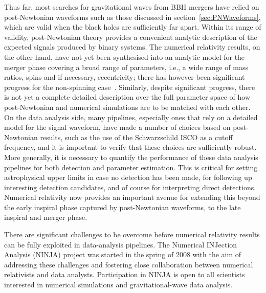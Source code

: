 \newcommand{\Ytwo}{{{}^{-2}Y}}

\newcommand\T{}
\newcommand\B{}
\newcommand\TT{}
\newcommand\BB{}
\newcommand\TTT{}



Thus far, most searches for gravitational waves from BBH mergers have
relied on post-Newtonian waveforms such as those discussed in
section~\ref{sec:PNWaveforms}, which are valid when the black holes
are sufficiently far apart.  Within its range of validity,
post-Newtonian theory provides a convenient analytic description of
the expected signals produced by binary systems.  The numerical
relativity results, on the other hand, have not yet been synthesised
into an analytic model for the merger phase covering a broad range of
parameters, i.e., a wide range of mass ratios, spins and if necessary,
eccentricity; there has however been significant progress for the
non-spinning
case~\cite{Buonanno:2006ui,Berti:2007fi,Ajith:2007kx,Pan:2007nw,%
Buonanno:2007pf,Boyle:2007ft,%
Ajith:2007qp,Damour:2007yf,Damour:2007vq,Damour:2008te,Boyle:2008ge,Boyle:2009dg}.
Similarly, despite significant progress, there is not yet a complete
detailed description over the full parameter space of how
post-Newtonian and numerical simulations are to be matched with each
other.  On the data analysis side, many pipelines, especially ones
that rely on a detailed model for the signal waveform, have made a
number of choices based on post-Newtonian results, such as the use of
the Schwarzschild ISCO as a cutoff frequency, and it is important to
verify that these choices are sufficiently robust.  More generally, it
is necessary to quantify the performance of these data analysis
pipelines for both detection and parameter estimation.  This is
critical for setting astrophysical upper limits in case no detection
has been made, for following up interesting detection candidates, and
of course for interpreting direct detections.  Numerical relativity
now provides an important avenue for extending this beyond the early
inspiral phase captured by post-Newtonian waveforms, to the late
inspiral and merger phase.  

There are significant challenges to be overcome before numerical
relativity results can be fully exploited in data-analysis pipelines.
The Numerical INJection Analysis (NINJA) project was started in the
spring of 2008 with the aim of addressing these challenges and
fostering close collaboration between numerical relativists and data
analysts. Participation in NINJA is open to all scientists interested
in numerical simulations and gravitational-wave data analysis.  

